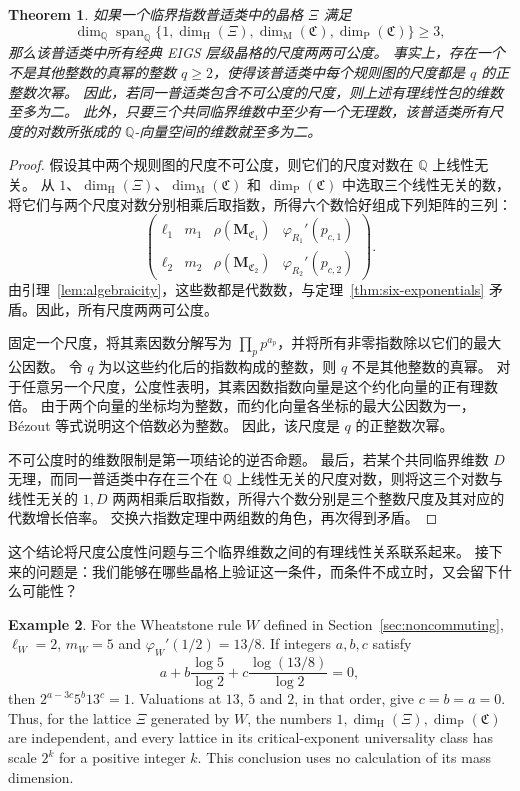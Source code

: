 \documentclass[scheme=plain,11pt]{ctexart}
\newtheorem{theorem}{Theorem}[section]
\theoremstyle{definition}
\newtheorem{example}[theorem]{Example}
\theoremstyle{remark}
\begin{document}
\begin{theorem}\label{thm:dimension-rank}\label{prop:arithmetic-alternatives}
如果一个临界指数普适类中的晶格 $\Xi$ 满足
\[
 \dim_{\mathbb Q}\operatorname{span}_{\mathbb Q}
 \{1,\dim_{\mathrm H}(\Xi),\dim_{\mathrm M}(\mathfrak C),\dim_{\mathrm P}(\mathfrak C)\}\ge3,
\]
那么该普适类中所有经典 EIGS 层级晶格的尺度两两可公度。
事实上，存在一个不是其他整数的真幂的整数 $q\ge2$，使得该普适类中每个规则图的尺度都是 $q$ 的正整数次幂。
因此，若同一普适类包含不可公度的尺度，则上述有理线性包的维数至多为二。
此外，只要三个共同临界维数中至少有一个无理数，该普适类所有尺度的对数所张成的 $\mathbb Q$-向量空间的维数就至多为二。
\end{theorem}
\begin{proof}
假设其中两个规则图的尺度不可公度，则它们的尺度对数在 $\mathbb Q$ 上线性无关。
从 $1$、$\dim_{\mathrm H}(\Xi)$、$\dim_{\mathrm M}(\mathfrak C)$ 和 $\dim_{\mathrm P}(\mathfrak C)$ 中选取三个线性无关的数，将它们与两个尺度对数分别相乘后取指数，所得六个数恰好组成下列矩阵的三列：
\[
 \begin{pmatrix}
 \ell_1&m_1&\rho(\mathbf M_{\mathfrak C_1})&\varphi_{R_1}'(p_{c,1})\\
 \ell_2&m_2&\rho(\mathbf M_{\mathfrak C_2})&\varphi_{R_2}'(p_{c,2})
 \end{pmatrix}.
\]
由引理~\ref{lem:algebraicity}，这些数都是代数数，与定理~\ref{thm:six-exponentials} 矛盾。因此，所有尺度两两可公度。

固定一个尺度，将其素因数分解写为 $\prod_p p^{a_p}$，并将所有非零指数除以它们的最大公因数。
令 $q$ 为以这些约化后的指数构成的整数，则 $q$ 不是其他整数的真幂。
对于任意另一个尺度，公度性表明，其素因数指数向量是这个约化向量的正有理数倍。
由于两个向量的坐标均为整数，而约化向量各坐标的最大公因数为一，B\'ezout 等式说明这个倍数必为整数。
因此，该尺度是 $q$ 的正整数次幂。

不可公度时的维数限制是第一项结论的逆否命题。
最后，若某个共同临界维数 $D$ 无理，而同一普适类中存在三个在 $\mathbb Q$ 上线性无关的尺度对数，则将这三个对数与线性无关的 $1,D$ 两两相乘后取指数，所得六个数分别是三个整数尺度及其对应的代数增长倍率。
交换六指数定理中两组数的角色，再次得到矛盾。
\end{proof}

这个结论将尺度公度性问题与三个临界维数之间的有理线性关系联系起来。
接下来的问题是：我们能够在哪些晶格上验证这一条件，而条件不成立时，又会留下什么可能性？


\begin{example}\label{ex:wheatstone-arithmetic}
For the Wheatstone rule $W$ defined in Section~\ref{sec:noncommuting}, $\ell_W=2$, $m_W=5$ and $\varphi_W'(1/2)=13/8$. If integers $a,b,c$ satisfy
\[
 a+b\frac{\log5}{\log2}+c\frac{\log(13/8)}{\log2}=0,
\]
then $2^{a-3c}5^b13^c=1$. Valuations at $13$, $5$ and $2$, in that order, give $c=b=a=0$. Thus, for the lattice $\Xi$ generated by $W$, the numbers $1,\dim_{\mathrm H}(\Xi),\dim_{\mathrm P}(\mathfrak C)$ are independent, and every lattice in its critical-exponent universality class has scale $2^k$ for a positive integer $k$. This conclusion uses no calculation of its mass dimension.
\end{example}
\end{document}
